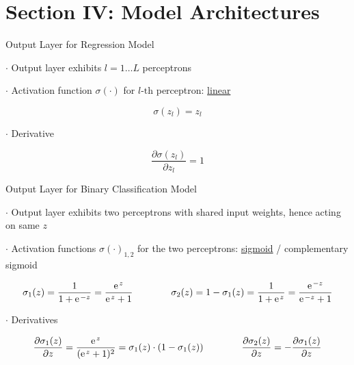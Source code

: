 \documentclass[mathserif, aspectratio=1610]{intbeamer}
\begin{document}
\section{Section IV: Model Architectures}
\begin{frame}[t]{Output Layer for Regression Model}

$\cdot$ Output layer exhibits $l=1 \dots L$ perceptrons

$\cdot$ Activation function $\sigma(\cdot)$ for $l\text{-th}$ perceptron: \underline{linear}

$$\sigma(z_l) = z_l$$

$\cdot$ Derivative

$$\frac{\partial \sigma(z_l)}{\partial z_l} = 1$$

\end{frame}



\begin{frame}[t]{Output Layer for Binary Classification Model}

$\cdot$ Output layer exhibits two perceptrons with shared input weights, hence acting on same $z$

$\cdot$ Activation functions $\sigma(\cdot)_{1,2}$ for the two perceptrons: \underline{sigmoid} / complementary sigmoid

$$\sigma_1(z) = \frac{1}{1+\e^{-z}} = \frac{\e^{z}}{\e^{z}+1} \qquad\qquad \sigma_2(z) = 1-\sigma_1(z) = \frac{1}{1 + \e^{z}} = \frac{\e^{-z}}{\e^{-z}+1}$$

\begin{center}
\end{center}

$\cdot$ Derivatives

$$\frac{\partial \sigma_1(z)}{\partial z} = \frac{\e^{z}}{(\e^{z}+1)^2} = \sigma_1(z) \cdot (1-\sigma_1(z)) \qquad\qquad \frac{\partial \sigma_2(z)}{\partial z} = - \frac{\partial \sigma_1(z)}{\partial z} $$

\end{frame}
\end{document}
